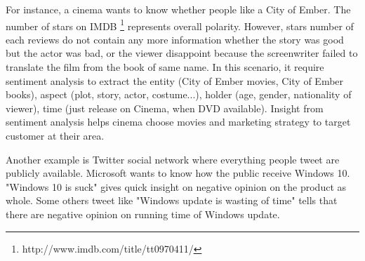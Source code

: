 For instance, a cinema wants to know whether people like a City of Ember. The number of stars on IMDB \footnote{http://www.imdb.com/title/tt0970411/} represents overall polarity. However, stars number of each reviews do not contain any more information whether the story was good but the actor was bad, or the viewer disappoint because the screenwriter failed to translate the film from the book of same name. In this scenario, it require sentiment analysis to extract the entity (City of Ember movies, City of Ember books), aspect (plot, story, actor, costume...), holder (age, gender, nationality of viewer), time (just release on Cinema, when DVD available). Insight from sentiment analysis helps cinema choose movies and marketing strategy to target customer at their area.

Another example is Twitter social network where everything people tweet are publicly available. Microsoft wants to know how the public receive Windows 10. "Windows 10 is suck" gives quick insight on negative opinion on the product as whole. Some others tweet like "Windows update is wasting of time" tells that there are negative opinion on running time of Windows update.


